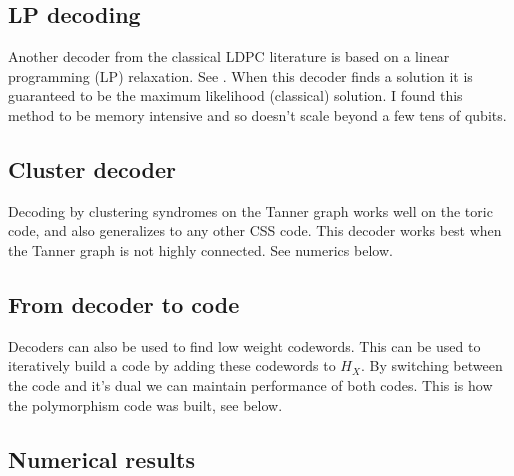 \documentclass[12pt]{article}
\begin{document}
\subsection{LP decoding}

Another decoder from 
the classical LDPC literature 
is based on a linear programming (LP) relaxation.
See \cite{feldman2005}.
When this decoder finds a solution it is 
guaranteed to be the maximum likelihood (classical) solution.
I found this method to be memory intensive and
so doesn't scale beyond a few tens of qubits.

\subsection{Cluster decoder}

Decoding by 
clustering syndromes on the Tanner graph
works well on the toric code, and also
generalizes to any other CSS code.
This decoder works best when the Tanner
graph is not highly connected.
See numerics below.

\subsection{From decoder to code}

Decoders can also be used to find low weight codewords.
This can be used to iteratively build a code
by adding these codewords to $H_X.$ 
By switching between the code and it's dual we
can maintain performance of both codes.
This is how the polymorphism code was built, see below.

%

%
%


\subsection{Numerical results}
\end{document}
